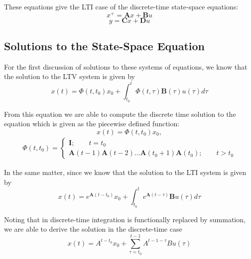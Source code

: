 \documentclass{article}
\begin{document}
These equations give the LTI case of the discrete-time state-space equations:
\begin{equation}
    x^{+}=\bm{A}x+\bm{B}u
\end{equation}
\begin{equation}
    y=\bm{C}x+\bm{D}u
\end{equation}

\subsection{Solutions to the State-Space Equation}
For the first discussion of solutions to these systems of equations, we know that the solution to the LTV system is given by 
\begin{equation}
    x(t)=\Phi(t,t_0)x_0+\int_{t_0}^{t} \Phi(t,\tau)\bm{B}(\tau)u(\tau)d\tau
\end{equation}
 
 From this equation we are able to compute the discrete time solution to the equation which is given as the piecewise defined function:
\begin{equation}
    x(t)=\Phi(t,t_0)x_0,
\end{equation}
\begin{align}
    \Phi(t,t_0)=
    \begin{cases}
        \bm{I};\qquad t=t_0 \\
        \bm{A}(t-1)\bm{A}(t-2)...\bm{A}(t_0+1)\bm{A}(t_0); \qquad t>t_0
    \end{cases}
\end{align}

In the same matter, since we know that the solution to the LTI system is given by
\begin{equation}
    x(t)=e^{\bm{A}(t-t_0)}x_0+\int_{t_0}^{t} e^{\bm{A}(t-\tau)}\bm{B}u(\tau)d\tau
\end{equation}

Noting that in discrete-time integration is functionally replaced by summation, we are able to derive the solution in the discrete-time case 
\begin{equation}
    x(t) = A^{t - t_0} x_0 + \sum_{\tau = t_0}^{t-1} A^{t-1-\tau} B u(\tau)
\end{equation}
\end{document}
